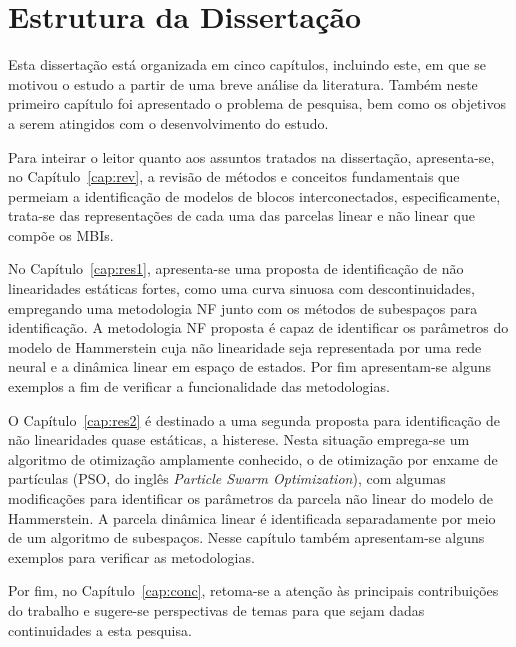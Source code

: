 \section{Estrutura da Dissertação} 
\label{sec:intro_estrutura}
%
\par
Esta dissertação está organizada em cinco capítulos, incluindo este, em que se motivou o estudo a partir de uma breve análise da literatura. Também neste primeiro capítulo foi apresentado o problema de pesquisa, bem como os objetivos a serem atingidos com o desenvolvimento do estudo.
%
\par
Para inteirar o leitor quanto aos assuntos tratados na dissertação, apresenta-se, no Capítulo~\ref{cap:rev}, a revisão de métodos e conceitos fundamentais que permeiam a identificação de modelos de blocos interconectados, especificamente, trata-se das representações de cada uma das parcelas linear e não linear que compõe os \acsp{MBI}.
%
\par
No Capítulo~\ref{cap:res1}, apresenta-se uma proposta de identificação de não linearidades estáticas fortes, como uma curva sinuosa com descontinuidades, empregando uma metodologia \acs{NF} junto com os métodos de  subespaços para identificação. A metodologia \acs{NF} proposta é capaz de identificar os parâmetros do modelo de Hammerstein cuja não linearidade seja representada por uma rede neural e a dinâmica linear em espaço de estados. Por fim apresentam-se alguns exemplos a fim de verificar a funcionalidade das metodologias.
%
\par
O Capítulo~\ref{cap:res2} é destinado a uma segunda proposta para identificação de não linearidades quase estáticas, a histerese. Nesta situação emprega-se um algoritmo de otimização amplamente conhecido, o de otimização por enxame de partículas (\acs{PSO}, do inglês \textit{Particle Swarm Optimization}), com algumas modificações para identificar os parâmetros da parcela não linear do modelo de Hammerstein. A parcela dinâmica linear é identificada separadamente por meio de um algoritmo de subespaços. Nesse capítulo também apresentam-se alguns exemplos para verificar as metodologias.
%
\par
Por fim, no Capítulo~\ref{cap:conc}, retoma-se a atenção às principais contribuições do trabalho e sugere-se perspectivas de temas para que sejam dadas continuidades a esta pesquisa. 
\clearpage


